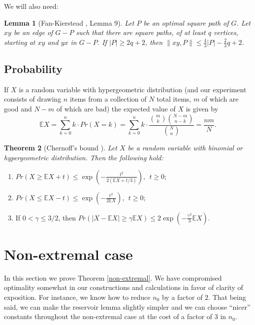 \documentclass[oneside,12pt]{memoir}
\newtheorem{theorem}{Theorem}[section]
\newtheorem{lemma}[theorem]{Lemma}
\newcommand{\g}{\gamma}
\begin{document}
We will also need:
\begin{lemma}
[Fan-Kierstead \cite{FK2}, Lemma 9]\label{edgetopath} Let $P$
be an optimal square path of $G$. Let $xy$ be an edge of $G-P$
such that there are square paths, of at least $q$ vertices, starting
at $xy$ and $yx$ in $G-P$. If $|P|\geq 2q+2$, then $\|xy,P\|\leq\frac{4}{3}|P|-\frac{2}{3}q+2$. 
\end{lemma}

\subsection{Probability}

If $X$ is a random variable with hypergeometric distribution (and 
our experiment consists of drawing $n$ items from a collection of
$N$ total items, $m$ of which are good and $N-m$ of which are bad)
the expected value of $X$ is given by \[
\mathbb{E}X=\sum_{k=0}^{n}k\cdot Pr(X=k)=\sum_{k=0}^{n}k\cdot\frac{\binom{m}{k}\binom{N-m}{n-k}}{\binom{N}{n}}=\frac{nm}{N}.\]

\begin{theorem}
[Chernoff's bound \cite{Ch,JLR}]\label{Chernoff} Let $X$ be a random variable
with binomial or hypergeometric distribution. Then the following hold:\end{theorem}
\begin{enumerate}
\item $Pr(X\geq\mathbb{E}X+t)\leq\exp\left(-\frac{t^{2}}{2(\mathbb{E}X+t/3)}\right),~~t\geq0$;
\item $Pr(X\leq\mathbb{E}X-t)\leq\exp\left(-\frac{t^{2}}{2\mathbb{E}X}\right),~~t\geq0$;
\item If $0<\g\leq3/2$, then $Pr(|X-\mathbb{E}X|\geq\g\mathbb{E}X)\leq2\exp\left(-\frac{\g^{2}}{3}\mathbb{E}X\right)$.
\end{enumerate}

\section{Non-extremal case\label{sec:nex}}

In this section we prove Theorem \ref{non-extremal}.  We have compromised optimality somewhat in our constructions %
 and calculations in favor of clarity of exposition.  For instance, we know how to reduce $n_0$ by a factor of $2$.  That being said, we can make the reservoir lemma slightly simpler and we can choose ``nicer'' constants throughout the non-extremal case at the cost of a factor of $3$ in $n_0$.
\end{document}
